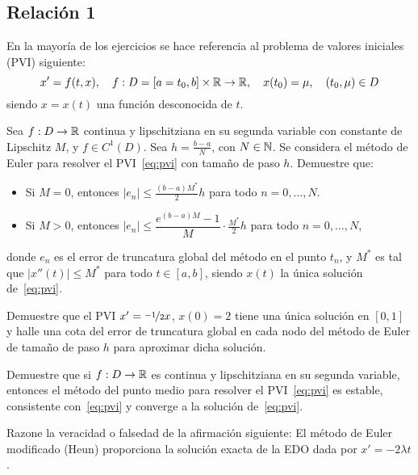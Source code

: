 \subsection{Relación 1}
\setcounter{ejercicio}{0}

En la mayoría de los ejercicios se hace referencia al problema de valores iniciales (PVI) siguiente:
\begin{equation}\label{eq:pvi}
    x' = f(t, x),\quad f : D = [a = t_0, b] \times \mathbb{R} \to \mathbb{R},\quad x(t_0) = \mu,\quad (t_0, \mu) \in D
\end{equation}
siendo $x = x(t)$ una función desconocida de $t$.

\begin{ejercicio}\label{ej:3.1.1}
    Sea $f : D \to \mathbb{R}$ continua y lipschitziana en su segunda variable con constante de Lipschitz $M$, y $f\in C^1(D)$. Sea $h = \frac{b-a}{N}$, con $N \in \mathbb{N}$. Se considera el método de Euler para resolver el PVI~\eqref{eq:pvi} con tamaño de paso $h$. Demuestre que:
    \begin{itemize}
        \item Si $M = 0$, entonces $|e_n| \leq \frac{(b-a)M^*}{2} h$ para todo $n = 0, \ldots, N$.
        \item Si $M > 0$, entonces $|e_n| \leq \dfrac{e^{(b-a)M} - 1}{M} \cdot \frac{M^*}{2} h$ para todo $n = 0, \ldots, N$,
    \end{itemize}
    donde $e_n$ es el error de truncatura global del método en el punto $t_n$, y $M^*$ es tal que $|x''(t)| \leq M^*$ para todo $t \in [a, b]$, siendo $x(t)$ la única solución de~\eqref{eq:pvi}.    
\end{ejercicio}


\begin{ejercicio}\label{ej:3.1.2}
    Demuestre que el PVI $x' = \nicefrac{-1}{2} x$, $x(0) = 2$ tiene una única solución en $[0, 1]$ y halle una cota del error de truncatura global en cada nodo del método de Euler de tamaño de paso $h$ para aproximar dicha solución.
\end{ejercicio}

\begin{ejercicio}\label{ej:3.1.3}
    Demuestre que si $f : D \to \mathbb{R}$ es continua y lipschitziana en su segunda variable, entonces el método del punto medio para resolver el PVI~\eqref{eq:pvi} es estable, consistente con~\eqref{eq:pvi} y converge a la solución de~\eqref{eq:pvi}.
\end{ejercicio}

\begin{ejercicio}\label{ej:3.1.4}
    Razone la veracidad o falsedad de la afirmación siguiente: El método de Euler modificado (Heun) proporciona la solución exacta de la EDO dada por $x' = -2\lambda t$.
\end{ejercicio}

